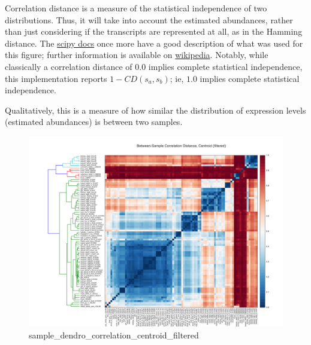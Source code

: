 \documentclass{article}
\begin{document}
    Correlation distance is a measure of the statistical independence of two
distributions. Thus, it will take into account the estimated abundances,
rather than just considering if the transcripts are represented at all,
as in the Hamming distance. The
\href{http://docs.scipy.org/doc/scipy-0.13.0/reference/generated/scipy.spatial.distance.correlation.html\#scipy.spatial.distance.correlation}{scipy
docs} once more have a good description of what was used for this
figure; further information is available on
\href{http://en.wikipedia.org/wiki/Distance_correlation}{wikipedia}.
Notably, while classically a correlation distance of $0.0$ implies
complete statistical independence, this implementation reports
$1-CD(s_a,s_b)$; ie, $1.0$ implies complete statistical independence.

Qualitatively, this is a measure of how similar the distribution of
expression levels (estimated abundances) is between two samples.

\begin{figure}[htbp]
\centering
\includegraphics{sample_dendro_correlation_centroid_filtered.svg}
\caption{sample\_dendro\_correlation\_centroid\_filtered}
\end{figure}
\end{document}
